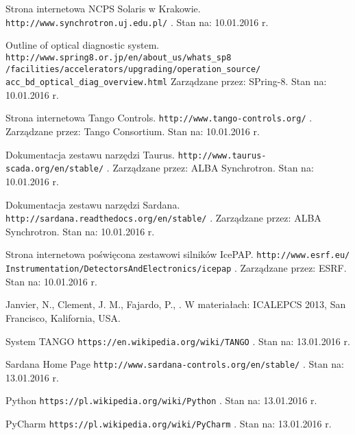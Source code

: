 \clearpage

\begin{thebibliography}{99} %
	
Strona internetowa NCPS Solaris w Krakowie.
\newblock \texttt{http://www.synchrotron.uj.edu.pl/} .
\newblock Stan na: 10.01.2016 r.

Outline of optical diagnostic system.
\newblock \texttt{http://www.spring8.or.jp/en/about\_us/whats\_sp8\\/facilities/accelerators/upgrading/operation\_source/\\acc\_bd\_optical\_diag\_overview.html}
\newblock Zarządzane przez: SPring-8.
\newblock Stan na: 10.01.2016 r.

Strona internetowa Tango Controls.
\newblock \texttt{http://www.tango-controls.org/} .
\newblock Zarządzane przez: Tango Consortium.
\newblock Stan na: 10.01.2016 r.

Dokumentacja zestawu narzędzi Taurus.
\newblock \texttt{http://www.taurus-scada.org/en/stable/} .
\newblock Zarządzane przez: ALBA Synchrotron.
\newblock Stan na: 10.01.2016 r.

Dokumentacja zestawu narzędzi Sardana.
\newblock \texttt{http://sardana.readthedocs.org/en/stable/} .
\newblock Zarządzane przez: ALBA Synchrotron.
\newblock Stan na: 10.01.2016 r.

Strona internetowa poświęcona zestawowi silników IcePAP.
\newblock \texttt{http://www.esrf.eu/\\Instrumentation/DetectorsAndElectronics/icepap} .
\newblock Zarządzane przez: ESRF.
\newblock Stan na: 10.01.2016 r.

Janvier, N., Clement, J. M., Fajardo, P.,  
.
\newblock W materiałach: ICALEPCS 2013, San Francisco, Kalifornia, USA.

System TANGO
\newblock \texttt{https://en.wikipedia.org/wiki/TANGO} .
\newblock Stan na: 13.01.2016 r.

Sardana Home Page
\newblock \texttt{http://www.sardana-controls.org/en/stable/} .
\newblock Stan na: 13.01.2016 r.

Python
\newblock \texttt{https://pl.wikipedia.org/wiki/Python} .
\newblock Stan na: 13.01.2016 r.

PyCharm
\newblock \texttt{https://pl.wikipedia.org/wiki/PyCharm} .
\newblock Stan na: 13.01.2016 r.



\end{thebibliography}